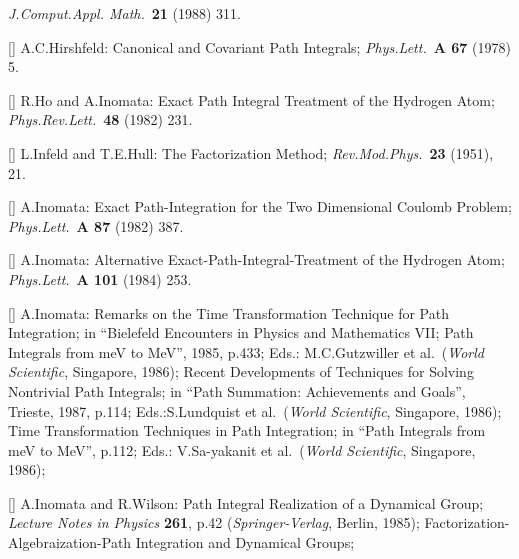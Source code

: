 {\it J.Comput.Appl. Math.}\ {\bf 21} (1988) 311.
\item{[\HIR]}
A.C.Hirshfeld:
Canonical and Covariant Path Integrals;
{\it Phys.Lett.}\ {\bf A 67} (1978) 5.
\item{[\HOI]}
R.Ho and A.Inomata:
Exact Path Integral Treatment of the Hydrogen Atom;
{\it Phys.Rev.Lett.}\ {\bf 48} (1982) 231.
\item{[\INH]}
L.Infeld and T.E.Hull:
The Factorization Method;
{\it Rev.Mod.Phys.}\ {\bf 23} (1951), 21.
\item{[\INOa]}
A.Inomata:
Exact Path-Integration for the Two Dimensional Coulomb Problem;
{\it Phys.Lett.}\ {\bf A 87} (1982) 387.
\item{[\INOb]}
A.Inomata:
Alternative Exact-Path-Integral-Treatment of the Hydrogen Atom;
{\it Phys.Lett.}\ {\bf A 101} (1984) 253.
\item{[\INOd]}
A.Inomata:
Remarks on the Time Transformation Technique for Path Integration; in
``Bielefeld Encounters in Physics and Mathematics VII; Path Integrals
from meV to MeV'', 1985, p.433; Eds.:
M.C.Gutzwiller et al.\ ({\it World Scientific}, Singapore, 1986);
\newline
Recent Developments of Techniques for Solving Nontrivial Path Integrals;
in ``Path Summation: Achievements and Goals'', Trieste, 1987, p.114;
Eds.:S.Lundquist et al.\ ({\it World Scientific}, Singapore, 1986);
\newline
Time Transformation Techniques in Path Integration;
in ``Path Integrals from meV to MeV'', p.112; Eds.: V.Sa-yakanit
et al.\ ({\it World Scientific}, Singapore, 1986);
\item{[\INOWI]}
A.Inomata and R.Wilson:
Path Integral Realization of a Dynamical Group;
{\it Lecture Notes in Physics} {\bf 261}, p.42
({\it Springer-Verlag},  Berlin, 1985);
Factorization-Algebraization-Path Integration and Dynamical Groups;
